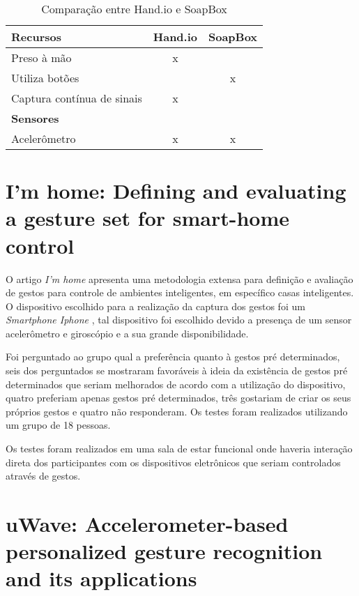\begin{table}[h!]
	\centering
    \caption{Comparação entre Hand.io e SoapBox}
    \label{tab:comp_soapbox}
	\begin{tabular}{|l|c|c|}
    	\hline
		\textbf{Recursos} & \textbf{Hand.io} & \textbf{SoapBox} \\
        \hline
        \hline
        Preso à mão & x &  \\
        \hline
        Utiliza botões &  & x \\
        \hline
        Captura contínua de sinais & x &  \\
        \hline
        \hline
        \textbf{Sensores} & & \\
        \hline
        \hline
        Acelerômetro & x & x \\
        \hline
	\end{tabular}

\end{table}




\section{I'm home: Defining and evaluating a gesture set for smart-home control}

O artigo \textit{I'm home} \cite{imhome:2011} apresenta uma metodologia extensa para definição e avaliação de gestos para controle de ambientes inteligentes, em específico casas inteligentes. 
O dispositivo escolhido para a realização da captura dos gestos foi um \textit{Smartphone Iphone} , tal dispositivo foi escolhido devido a presença de um sensor acelerômetro e giroscópio e a sua grande disponibilidade. 

Foi perguntado ao grupo qual a preferência quanto à gestos pré determinados, seis dos perguntados se mostraram favoráveis à ideia da existência de gestos pré determinados que seriam melhorados de acordo com a utilização do dispositivo, quatro preferiam apenas gestos pré determinados, três gostariam de criar os seus próprios gestos e quatro não responderam. Os testes foram realizados utilizando um grupo de 18 pessoas. 

Os testes foram realizados em uma sala de estar funcional onde haveria interação direta dos participantes com os dispositivos eletrônicos que seriam controlados através de gestos.


\section{uWave: Accelerometer-based personalized gesture recognition and its applications}

